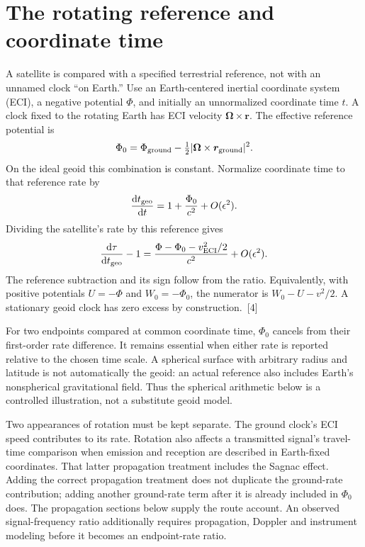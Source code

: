 \documentclass[10pt,twocolumn,letterpaper]{article}
\newcommand{\dd}{\mathrm{d}}
\begin{document}
\section{The rotating reference and coordinate time}
A satellite is compared with a specified terrestrial reference, not with an unnamed clock ``on Earth.'' Use an Earth-centered inertial coordinate system (ECI), a negative potential $\Phi$, and initially an unnormalized coordinate time $t$. A clock fixed to the rotating Earth has ECI velocity $\bm\Omega\mathbin\times\bm r$. The effective reference potential is
\[
 \Phi_0=\Phi_{\rm ground}
       -\tfrac 12|\bm\Omega\mathbin\times\bm r_{\rm ground}|^2.
\]
On the ideal geoid this combination is constant. Normalize coordinate time to that reference rate by
\[
 \frac{\dd t_{\rm geo}}{\dd t}=1+\frac{\Phi_0}{c^2}+O(\epsilon^2).
\]
Dividing the satellite's rate by this reference gives
\begin{equation}
 \frac{\dd\tau}{\dd t_{\rm geo}}-1
 =\frac{\Phi-\Phi_0-v_{\rm ECI}^2/2}{c^2}
 +O(\epsilon^2).
 \label{eq:geoid-rate}
\end{equation}
The reference subtraction and its sign follow from the ratio. Equivalently, with positive potentials $U=-\Phi$ and $W_0=-\Phi_0$, the numerator is $W_0-U-v^2/2$. A stationary geoid clock has zero excess by construction.~[4]

For two endpoints compared at common coordinate time, $\Phi_0$ cancels from their first-order rate difference. It remains essential when either rate is reported relative to the chosen time scale. A spherical surface with arbitrary radius and latitude is not automatically the geoid: an actual reference also includes Earth's nonspherical gravitational field. Thus the spherical arithmetic below is a controlled illustration, not a substitute geoid model.

Two appearances of rotation must be kept separate. The ground clock's ECI speed contributes to its rate. Rotation also affects a transmitted signal's travel-time comparison when emission and reception are described in Earth-fixed coordinates. That latter propagation treatment includes the Sagnac effect. Adding the correct propagation treatment does not duplicate the ground-rate contribution; adding another ground-rate term after it is already included in $\Phi_0$ does. The propagation sections below supply the route account. An observed signal-frequency ratio additionally requires propagation, Doppler and instrument modeling before it becomes an endpoint-rate ratio.
\end{document}
